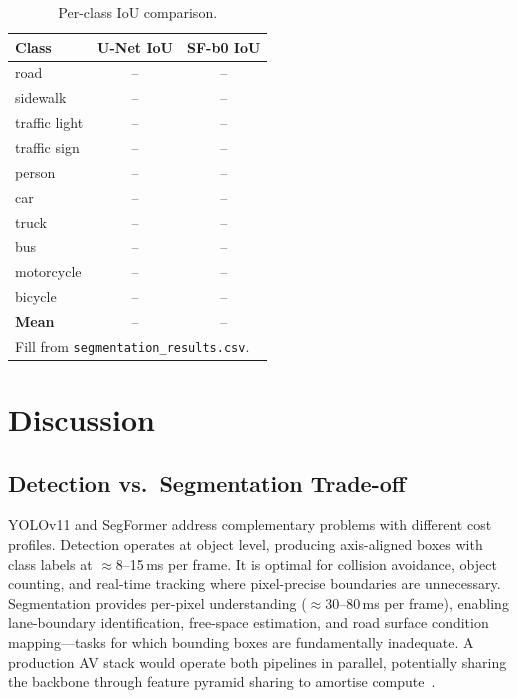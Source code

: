 \documentclass[10pt,twocolumn]{article}
\begin{document}
\begin{table}[H]
\centering
\caption{Per-class IoU comparison.}
\label{tab:seg_perclass}
\small
\begin{tabular}{@{}lcc@{}}
\toprule
\textbf{Class} & \textbf{U-Net IoU} & \textbf{SF-b0 IoU} \\
\midrule
road           & -- & -- \\
sidewalk       & -- & -- \\
traffic light  & -- & -- \\
traffic sign   & -- & -- \\
person         & -- & -- \\
car            & -- & -- \\
truck          & -- & -- \\
bus            & -- & -- \\
motorcycle     & -- & -- \\
bicycle        & -- & -- \\
\midrule
\textbf{Mean}  & -- & -- \\
\bottomrule
\multicolumn{3}{l}{\scriptsize Fill from \texttt{segmentation\_results.csv}.}
\end{tabular}
\end{table}

\section{Discussion}
\label{sec:discussion}

\subsection{Detection vs.\ Segmentation Trade-off}

YOLOv11 and SegFormer address complementary problems with different cost profiles.
Detection operates at object level, producing axis-aligned boxes with class
labels at $\approx$8--15\,ms per frame.  It is optimal for collision avoidance,
object counting, and real-time tracking where pixel-precise boundaries are
unnecessary.  Segmentation provides per-pixel understanding ($\approx$30--80\,ms
per frame), enabling lane-boundary identification, free-space estimation, and
road surface condition mapping---tasks for which bounding boxes are fundamentally
inadequate.  A production AV stack would operate both pipelines in parallel,
potentially sharing the backbone through feature pyramid sharing to amortise
compute~\cite{ghiasi2019fpn}.
\end{document}
